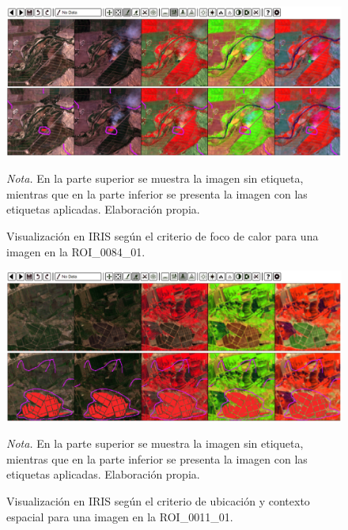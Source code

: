 \begin{figure}[H]
    \centering
    \caption{Visualización en IRIS según el criterio de foco de calor para una imagen en la ROI\_0084\_01.}
    \includegraphics[width=1\textwidth]{img/6_metodologia/etiquetado_3.png}
    \label{fig:etiquetado3}
    \begin{flushleft}
        \vspace{-\baselineskip}
        \textit{Nota.} En la parte superior se muestra la imagen sin etiqueta, mientras que en la parte inferior se presenta la imagen con las etiquetas aplicadas. Elaboración propia.        
        \vspace{-\baselineskip}
    \end{flushleft}
\end{figure}

\begin{figure}[H]
    \centering
    \caption{Visualización en IRIS según el criterio de ubicación y contexto espacial para una imagen en la ROI\_0011\_01.}    
    \includegraphics[width=1\textwidth]{img/6_metodologia/etiquetado_4.png}
    \label{fig:etiquetado4}
    \begin{flushleft}
        \vspace{-\baselineskip}
        \textit{Nota.} En la parte superior se muestra la imagen sin etiqueta, mientras que en la parte inferior se presenta la imagen con las etiquetas aplicadas. Elaboración propia.        
        \vspace{-\baselineskip}
    \end{flushleft}
\end{figure}

